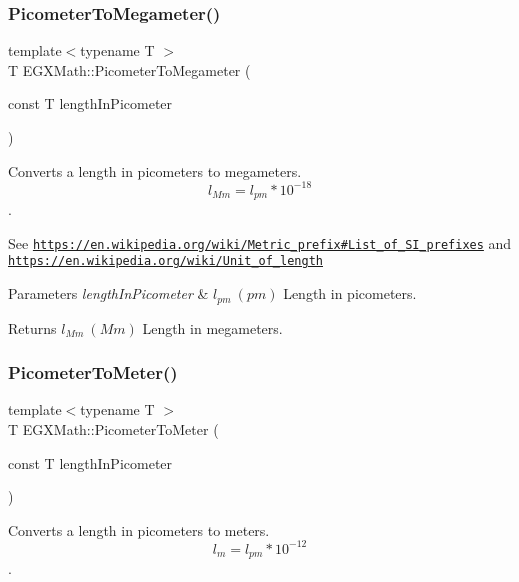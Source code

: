 \subsubsection{\texorpdfstring{Picometer\+To\+Megameter()}{PicometerToMegameter()}}
{\footnotesize\ttfamily template$<$typename T $>$ \\
T E\+G\+X\+Math\+::\+Picometer\+To\+Megameter (\begin{DoxyParamCaption}\item[{const T}]{length\+In\+Picometer }\end{DoxyParamCaption})}



Converts a length in picometers to megameters. \[ l_{Mm}=l_{pm} * 10^{-18} \]. 

See \href{https://en.wikipedia.org/wiki/Metric_prefix#List_of_SI_prefixes}{\tt https\+://en.\+wikipedia.\+org/wiki/\+Metric\+\_\+prefix\#\+List\+\_\+of\+\_\+\+S\+I\+\_\+prefixes} and \href{https://en.wikipedia.org/wiki/Unit_of_length}{\tt https\+://en.\+wikipedia.\+org/wiki/\+Unit\+\_\+of\+\_\+length} 
\begin{DoxyParams}{Parameters}
{\em length\+In\+Picometer} & $ l_{pm}\ (pm)$ Length in picometers. \\
\hline
\end{DoxyParams}
\begin{DoxyReturn}{Returns}
$ l_{Mm}\ (Mm)$ Length in megameters. 
\end{DoxyReturn}
\mbox{\label{group___e_g_x_math-_conversions-_length_conversions-_s_i-_picometer-_s_i_gab975f2eb902fcbb745ee4edbbf611f69}} 
\subsubsection{\texorpdfstring{Picometer\+To\+Meter()}{PicometerToMeter()}}
{\footnotesize\ttfamily template$<$typename T $>$ \\
T E\+G\+X\+Math\+::\+Picometer\+To\+Meter (\begin{DoxyParamCaption}\item[{const T}]{length\+In\+Picometer }\end{DoxyParamCaption})}



Converts a length in picometers to meters. \[ l_{m}=l_{pm} * 10^{-12} \]. 



